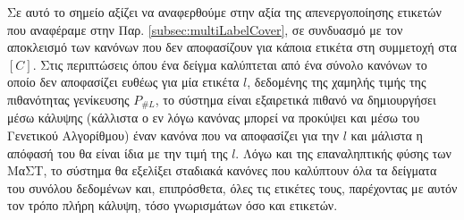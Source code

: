 Σε αυτό το σημείο αξίζει να αναφερθούμε στην αξία της απενεργοποίησης ετικετών που αναφέραμε στην Παρ. \ref{subsec:multiLabelCover}, σε συνδυασμό με τον αποκλεισμό των κανόνων που δεν αποφασίζουν για κάποια ετικέτα στη συμμετοχή στα $[C]$. Στις περιπτώσεις όπου ένα δείγμα καλύπτεται από ένα σύνολο κανόνων το οποίο δεν αποφασίζει ευθέως για μία ετικέτα $l$, δεδομένης της χαμηλής τιμής της πιθανότητας γενίκευσης $P_{\#L}$, το σύστημα είναι εξαιρετικά πιθανό να δημιουργήσει μέσω κάλυψης (κάλλιστα ο εν λόγω κανόνας μπορεί να προκύψει και μέσω του Γενετικού Αλγορίθμου) έναν κανόνα που να αποφασίζει για την $l$ και μάλιστα η απόφασή του θα είναι ίδια με την τιμή της $l$. Λόγω και της επαναληπτικής φύσης των ΜαΣΤ, το σύστημα θα εξελίξει σταδιακά κανόνες που καλύπτουν όλα τα δείγματα του συνόλου δεδομένων και, επιπρόσθετα, όλες τις ετικέτες τους, παρέχοντας με αυτόν τον τρόπο πλήρη κάλυψη, τόσο γνωρισμάτων όσο και ετικετών.
